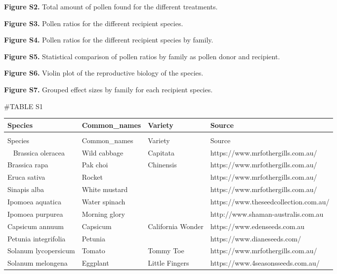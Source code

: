 \documentclass[
  12pt,
]{article}
\begin{document}
\textbf{Figure S2.} Total amount of pollen found for the different
treatments.

\textbf{Figure S3.} Pollen ratios for the different recipient species.

\textbf{Figure S4.} Pollen ratios for the different recipient species by
family.

\textbf{Figure S5.} Statistical comparison of pollen ratios by family as
pollen donor and recipient.

\textbf{Figure S6.} Violin plot of the reproductive biology of the
species.

\textbf{Figure S7.} Grouped effect sizes by family for each recipient
species.

\newpage

\#TABLE S1 \begingroup\fontsize{7}{9}\selectfont

\begin{longtabu} to 
\toprule
\textbf{Species} & \textbf{Common\_names} & \textbf{Variety} & \textbf{Source}\\
\midrule
\endfirsthead
{}\\
\toprule
Species & Common\_names & Variety & Source\\
\midrule
\endhead
\
\endfoot
\bottomrule
\endlastfoot
{}  Brassica oleracea & Wild cabbage & Capitata & https://www.mrfothergills.com.au/\\
\addlinespace
Brassica rapa & Pak choi & Chinensis & https://www.mrfothergills.com.au/\\
\addlinespace
{}  Eruca sativa & Rocket &  & https://www.mrfothergills.com.au/\\
\addlinespace
Sinapis alba & White mustard &  & https://www.mrfothergills.com.au/\\
\addlinespace
{}  Ipomoea aquatica & Water spinach &  & https://www.theseedcollection.com.au/\\
\addlinespace
Ipomoea purpurea & Morning glory &  & http://www.shaman-australis.com.au\\
\addlinespace
{}  Capsicum annuum & Capsicum & California Wonder & https://www.edenseeds.com.au\\
\addlinespace
Petunia integrifolia & Petunia &  & https://www.dianeseeds.com/\\
\addlinespace
{}  Solanum lycopersicum & Tomato & Tommy Toe & https://www.mrfothergills.com.au/\\
\addlinespace
Solanum melongena & Eggplant & Little Fingers & https://www.4seasonsseeds.com.au/\\*
\end{longtabu}
\endgroup{}
\end{document}
